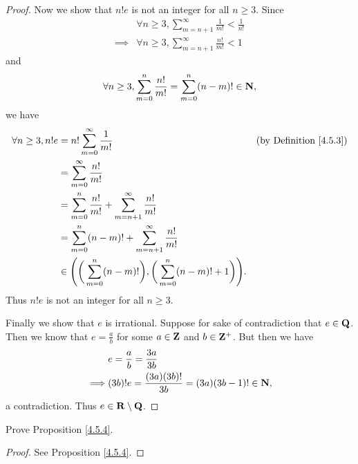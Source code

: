\begin{proof}
    Now we show that \(n! e\) is not an integer for all \(n \geq 3\).
    Since
    \begin{align*}
                 & \forall n \geq 3, \sum_{m = n + 1}^\infty \frac{1}{m!} < \frac{1}{n!} \\
        \implies & \forall n \geq 3, \sum_{m = n + 1}^\infty \frac{n!}{m!} < 1
    \end{align*}
    and
    \[
        \forall n \geq 3, \sum_{m = 0}^n \frac{n!}{m!} = \sum_{m = 0}^n (n - m)! \in \mathbf{N},
    \]
    we have
    \begin{align*}
        \forall n \geq 3, n! e & = n! \sum_{m = 0}^\infty \frac{1}{m!}                                                         & \text{(by Definition \ref{4.5.3})} \\
                               & = \sum_{m = 0}^\infty \frac{n!}{m!}                                                                                                \\
                               & = \sum_{m = 0}^n \frac{n!}{m!} + \sum_{m = n + 1}^\infty \frac{n!}{m!}                                                             \\
                               & = \sum_{m = 0}^n (n - m)! + \sum_{m = n + 1}^\infty \frac{n!}{m!}                                                                  \\
                               & \in \Bigg(\bigg(\sum_{m = 0}^n (n - m)!\bigg), \bigg(\sum_{m = 0}^n (n - m)! + 1\bigg)\Bigg).
    \end{align*}
    Thus \(n! e\) is not an integer for all \(n \geq 3\).

    Finally we show that \(e\) is irrational.
    Suppose for sake of contradiction that \(e \in \mathbf{Q}\).
    Then we know that \(e = \frac{a}{b}\) for some \(a \in \mathbf{Z}\) and \(b \in \mathbf{Z}^+\).
    But then we have
    \begin{align*}
                 & e = \frac{a}{b} = \frac{3a}{3b}                          \\
        \implies & (3b)! e = \frac{(3a) (3b)!}{3b} = (3a) (3b - 1)! \in \mathbf{N},
    \end{align*}
    a contradiction.
    Thus \(e \in \mathbf{R} \setminus \mathbf{Q}\).
\end{proof}

\begin{exercise}\label{ex 4.5.3}
    Prove Proposition \ref{4.5.4}.
\end{exercise}

\begin{proof}
    See Proposition \ref{4.5.4}.
\end{proof}

